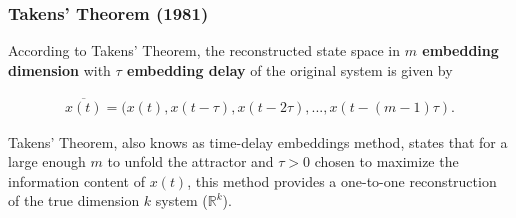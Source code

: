 \documentclass{beamer}
\begin{document}
\begin{frame}
\frametitle{Takens' Theorem (1981)}


According to Takens' Theorem, the reconstructed state space
in  \textbf{$m$ embedding dimension} with  \textbf{ $\tau$ embedding delay}
of the original system is given by 

\begin{eqnarray*} 
\overline{x(t)} = (x(t), x(t - \tau), x(t-2\tau), ... , x (t-(m-1)\tau).
\end{eqnarray*}
 
Takens' Theorem, also knows as time-delay embeddings method, states
that for a large enough $m$ to unfold the attractor and $\tau > 0$ 
chosen to maximize the information content of $x(t)$, this method provides a 
one-to-one reconstruction of the true dimension $k$ system ($\mathbb{R}^k$).




% 
% 


\end{frame}
\end{document}
